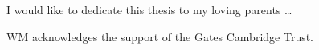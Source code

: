 
\begin{dedication} 

I would like to dedicate this thesis to my loving parents \dots

WM acknowledges the support of the Gates Cambridge Trust.

\end{dedication}